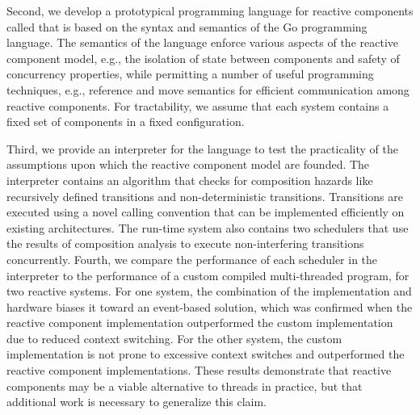 Second, we develop a prototypical programming language for reactive components called \emph{\rcgo{}} that is based on the syntax and semantics of the Go programming language.
The semantics of the \rcgo{} language enforce various aspects of the reactive component model, e.g., the isolation of state between components and safety of concurrency properties, while permitting a number of useful programming techniques, e.g., reference and move semantics for efficient communication among reactive components.
For tractability, we assume that each system contains a fixed set of components in a fixed configuration.

Third, we provide an interpreter for the \rcgo{} language to test the practicality of the assumptions upon which the reactive component model are founded.
The interpreter contains an algorithm that checks for composition hazards like recursively defined transitions and non-deterministic transitions.
Transitions are executed using a novel calling convention that can be implemented efficiently on existing architectures.
The run-time system also contains two schedulers that use the results of composition analysis to execute non-interfering transitions concurrently.
Fourth, we compare the performance of each scheduler in the interpreter to the performance of a custom compiled multi-threaded program, for two reactive systems.
For one system, the combination of the implementation and hardware biases it toward an event-based solution, which was confirmed when the reactive component implementation outperformed the custom implementation due to reduced context switching.
For the other system, the custom implementation is not prone to excessive context switches and outperformed the reactive component implementations.
These results demonstrate that reactive components may be a viable alternative to threads in practice, but that additional work is necessary to generalize this claim.
